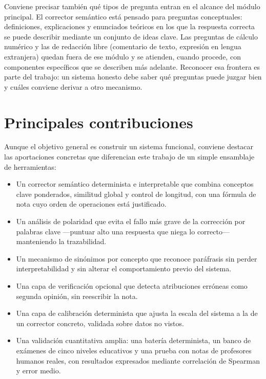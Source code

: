 Conviene precisar también qué tipos de pregunta entran en el alcance del módulo principal. El corrector semántico está pensado para preguntas conceptuales: definiciones, explicaciones y enunciados teóricos en los que la respuesta correcta se puede describir mediante un conjunto de ideas clave. Las preguntas de cálculo numérico y las de redacción libre (comentario de texto, expresión en lengua extranjera) quedan fuera de ese módulo y se atienden, cuando procede, con componentes específicos que se describen más adelante. Reconocer esa frontera es parte del trabajo: un sistema honesto debe saber qué preguntas puede juzgar bien y cuáles conviene derivar a otro mecanismo.

\section{Principales contribuciones}

Aunque el objetivo general es construir un sistema funcional, conviene destacar las aportaciones concretas que diferencian este trabajo de un simple ensamblaje de herramientas:

\begin{itemize}[leftmargin=1.4em]
  \item Un corrector semántico determinista e interpretable que combina conceptos clave ponderados, similitud global y control de longitud, con una fórmula de nota cuyo orden de operaciones está justificado.
  \item Un análisis de polaridad que evita el fallo más grave de la corrección por palabras clave —puntuar alto una respuesta que niega lo correcto— manteniendo la trazabilidad.
  \item Un mecanismo de sinónimos por concepto que reconoce paráfrasis sin perder interpretabilidad y sin alterar el comportamiento previo del sistema.
  \item Una capa de verificación opcional que detecta atribuciones erróneas como segunda opinión, sin reescribir la nota.
  \item Una capa de calibración determinista que ajusta la escala del sistema a la de un corrector concreto, validada sobre datos no vistos.
  \item Una validación cuantitativa amplia: una batería determinista, un banco de exámenes de cinco niveles educativos y una prueba con notas de profesores humanos reales, con resultados expresados mediante correlación de Spearman y error medio.
\end{itemize}


